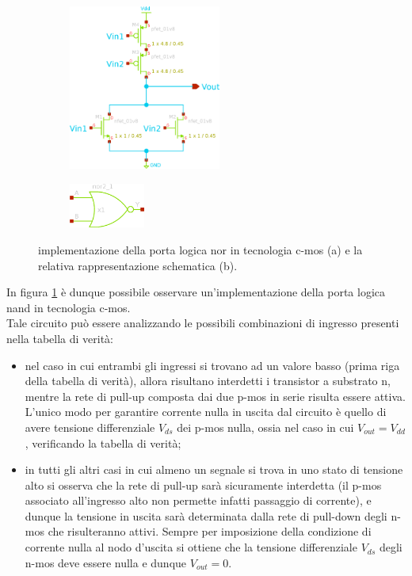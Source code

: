 	\begin{figure}[bht]
		\centering
		\begin{subfigure}{0.48\linewidth}
			\centering
			\includegraphics[width=5cm]{Immagini/nor-gate.eps} \caption{}			
		\end{subfigure}
		\begin{subfigure}{0.48\linewidth}
			\centering
			\includegraphics[width=2.5cm]{Immagini/nor-gate-simple.eps} \caption{}			
		\end{subfigure}
		\caption{implementazione della porta logica nor in tecnologia c-mos (a) e la relativa rappresentazione schematica (b).}
		\label{fig:nor:schematico}
	\end{figure}

	In figura \ref{fig:nor:schematico} è dunque possibile osservare un'implementazione della porta logica nand in tecnologia c-mos.\\
	Tale circuito può essere analizzando le possibili combinazioni di ingresso presenti nella tabella di verità:
	\begin{itemize}
		\item nel caso in cui entrambi gli ingressi si trovano ad un valore basso (prima riga della tabella di verità), allora risultano interdetti i transistor a substrato n, mentre la rete di pull-up composta dai due p-mos in serie risulta essere attiva. L'unico modo per garantire corrente nulla in uscita dal circuito è quello di avere tensione differenziale $V_{ds}$ dei p-mos nulla, ossia nel caso in cui $V_{out} = V_{dd}$, verificando la tabella di verità;
		
		\item in tutti gli altri casi in cui almeno un segnale si trova in uno stato di tensione alto si osserva che la rete di pull-up sarà sicuramente interdetta (il p-mos associato all'ingresso alto non permette infatti passaggio di corrente), e dunque la tensione in uscita sarà determinata dalla rete di pull-down degli n-mos che risulteranno attivi. Sempre per imposizione della condizione di corrente nulla al nodo d'uscita si ottiene che la tensione differenziale $V_{ds}$ degli n-mos deve essere nulla e dunque $V_{out} = 0$.
	\end{itemize}
	
